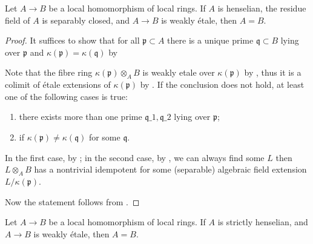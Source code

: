 \begin{theorem}
    \label{thm:weakly-etale-over-henselian-sep-closed}
    Let $A \to B$ be a local homomorphism of local rings. If $A$ is henselian, the residue field
    of $A$ is separably closed, and $A \to B$ is weakly étale, then $A = B$.
    \leanok
\end{theorem}

\begin{proof}
    It suffices to show that for all $\mathfrak{p} \subset A$ there is a unique prime
    $\mathfrak{q} \subset B$ lying over $\mathfrak{p}$ and $\kappa(\mathfrak{p}) =
    \kappa(\mathfrak{q})$ by 

    Note that the fibre ring $\kappa(\mathfrak{p}) \otimes_A B$ is weakly etale over
    $\kappa(\mathfrak{p})$ by , thus it is a colimit of étale
    extensions of $\kappa(\mathfrak{p})$ by .
    If the conclusion does not hold, at least one of the following cases is true:
    \begin{enumerate}
        \item there exists more than one prime $\mathfrak{q}\_1, \mathfrak{q}\_2$ lying over
    $\mathfrak{p}$;
        \item if $\kappa(\mathfrak{p}) \neq \kappa(\mathfrak{q})$ for some $\mathfrak{q}$.
    \end{enumerate}
    In the first case, by ; in the second case, by
    , we can always find some $L$
    then $L \otimes_A B$ has a nontrivial idempotent for some (separable)
    algebraic field extension $L/\kappa(\mathfrak{p})$.

    Now the statement follows from .
\end{proof}

\begin{theorem}
    \label{thm:weakly-etale-over-sh}
    Let $A \to B$ be a local homomorphism of local rings. If $A$ is strictly henselian,
    and $A \to B$ is weakly étale, then $A = B$.
    \leanok
\end{theorem}

